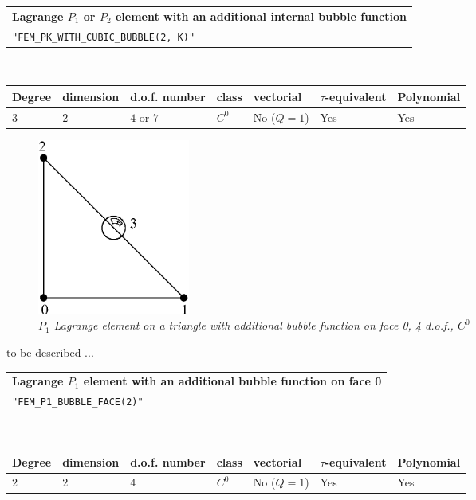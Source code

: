 \documentclass[11pt,a4paper]{article}
\begin{document}
\begin{center}
\begin{tabular}{|m{16.11cm}|} \hline 
{ \bf Lagrange $P_1$ or $P_2$ element with an additional internal bubble function}\\
{\tt "FEM\_PK\_WITH\_CUBIC\_BUBBLE(2, K)"} 
\end{tabular} \\ \vspace{-1pt} 
\begin{tabular}{|m{2cm}|m{2cm}|m{2.5cm}|m{1.2cm}|m{2cm}|m{2cm}|m{1.8cm}|} \hline 
Degree & dimension & d.o.f. number & class & vectorial & \mbox{$\tau$-equivalent} & Polynomial\\ \hline
$3$ & $2$ & $4$ or $7$ & $C^0$ & No \mbox{($Q = 1$)} & Yes & Yes\\ \hline
\end{tabular}
\end{center}

\begin{figure}[H]
  \begin{center}
    \includegraphics[width=5cm,angle=0]{getfemlist_triangle_P1_bubble_face.eps}
  \end{center}
  \caption{ \it $P_1$ Lagrange element on a triangle with additional bubble function on face 0, 4 d.o.f., $C^0$} 
  \label{fig:triangle_p1_bubble_face}
\end{figure}

to be described ...

\begin{center}
\begin{tabular}{|m{16.11cm}|} \hline 
{ \bf Lagrange $P_1$ element with an additional bubble function on face 0}\\
{\tt "FEM\_P1\_BUBBLE\_FACE(2)"} 
\end{tabular} \\ \vspace{-1pt} 
\begin{tabular}{|m{2cm}|m{2cm}|m{2.5cm}|m{1.2cm}|m{2cm}|m{2cm}|m{1.8cm}|} \hline 
Degree & dimension & d.o.f. number & class & vectorial & \mbox{$\tau$-equivalent} & Polynomial\\ \hline
$2$ & $2$ & $4$ & $C^0$ & No \mbox{($Q = 1$)} & Yes & Yes\\ \hline
\end{tabular}
\end{center}
\end{document}
